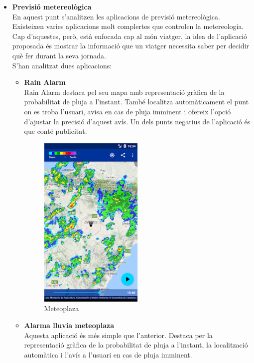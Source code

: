 \begin{itemize}
\begin{itemize}
\end{itemize}
\item{\textbf{Previsió metereològica}}\\
En aquest punt s’analitzen les aplicacions de previsió metereològica. Existeixen varies aplicacions molt complertes que controlen la metereologia. Cap d’aquestes, però, està enfocada cap al món viatger, la idea de l’aplicació proposada és mostrar la informació que un viatger necessita saber per decidir què fer durant la seva jornada.\\
S’han analitzat dues aplicacions:
\begin{itemize}
\item{\textbf{Rain Alarm}}\\
Rain Alarm destaca pel seu mapa amb representació gràfica de la probabilitat de pluja a l’instant. També localitza automàticament el punt on es troba l’usuari, avisa en cas de pluja imminent i ofereix l’opció d’ajustar la precisió d’aquest avís. Un dels punts negatius de l’aplicació és que conté publicitat.


\begin{figure}[!h]
\centering
\includegraphics[scale=0.90]{Figures/rainAlarm.jpg}
\caption{Meteoplaza}
\end{figure}

\item{\textbf{Alarma lluvia meteoplaza}}\\
Aquesta aplicació és més simple que l’anterior. Destaca per la representació gràfica de la probabilitat de pluja a l’instant, la localització automàtica i l’avís a l’usuari en cas de pluja imminent.


\end{itemize}
\end{itemize}
